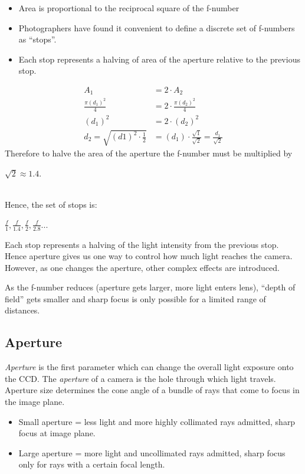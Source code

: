 \documentclass{article}
\begin{document}
\begin{itemize}
	\item Area is proportional to the reciprocal square of the f-number
	\item Photographers have found it convenient to define a discrete set of f-numbers as ``stops''.
	\item Each stop represents a halving of area of the aperture relative to the previous stop.
\end{itemize}
\begin{align*}
	A_1 &= 2\cdot A_2 \\
	\frac{\pi(d_1)^2}{4} &= 2\cdot \frac{\pi(d_2)^2}{4} \\
	(d_1)^2 &= 2\cdot (d_2)^2 \\
d_2 = \sqrt{(d1)^2\cdot\frac{1}{2}} &= (d_1)\cdot \frac{\sqrt{1}}{\sqrt{2}} = \frac{d_1}{\sqrt{2}}
\end{align*}
Therefore to halve the area of the aperture the f-number must be multiplied by \\ 
\centerline{$\sqrt{2} \approx 1.4$.} \\
Hence, the set of stops is:\\
\centerline{$\frac{f}{1}, \frac{f}{1.4}, \frac{f}{2}, \frac{f}{2.8} ...$}

Each stop represents a halving of the light intensity from the previous stop. 
Hence aperture gives us one way to control how much light reaches the camera.
However, as one changes the aperture, other complex effects are introduced.

As the f-number reduces (aperture gets larger, more light enters lens), ``depth of field'' gets smaller and sharp focus is only possible for a limited range of distances. 


\subsection{Aperture}
{\it Aperture} is the first parameter which can change the overall light exposure onto the CCD. 
The {\it aperture} of a camera is the hole through which light travels. 
Aperture size determines the cone angle of a bundle of rays that come to focus in the image plane. 

\begin{itemize}
	\item Small aperture = less light and more highly collimated rays admitted, sharp focus at image plane.

	\item Large aperture = more light and uncollimated rays admitted, sharp focus only for rays with a certain focal length.
\end{itemize}
\end{document}
